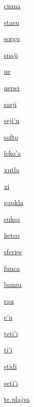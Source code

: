 {\hyperlink{val:cisma}{cisma}}{}{}{}

{\hyperlink{val:stasu}{stasu}}{}{}{}

{\hyperlink{val:sorgu}{sorgu}}{}{}{}

{\hyperlink{val:spaji}{spaji}}{}{}{}

{\hyperlink{val:ue}{ue}}{}{}{}

{\hyperlink{val:uepei}{uepei}}{}{}{}

{\hyperlink{val:sarji}{sarji}}{}{}{}

{\hyperlink{val:sejihu}{seji'u}}{}{}{}

{\hyperlink{val:softo}{softo}}{}{}{}

{\hyperlink{val:lekoha}{leko'a}}{}{}{}

{\hyperlink{val:xutla}{xutla}}{}{}{}

{\hyperlink{val:xi}{xi}}{}{}{}

{\hyperlink{val:gapkla}{gapkla}}{}{}{}

{\hyperlink{val:suksa}{suksa}}{}{}{}

{\hyperlink{val:ketco}{ketco}}{}{}{}

{\hyperlink{val:sferies}{sferies}}{}{}{}

{\hyperlink{val:funca}{funca}}{}{}{}

{\hyperlink{val:banzu}{banzu}}{}{}{}

{\hyperlink{val:rau}{rau}}{}{}{}

{\hyperlink{val:ehu}{e'u}}{}{}{}

{\hyperlink{val:tetihi}{teti'i}}{}{}{}

{\hyperlink{val:tihi}{ti'i}}{}{}{}

{\hyperlink{val:stidi}{stidi}}{}{}{}

{\hyperlink{val:setihi}{seti'i}}{}{}{}

{\hyperlink{val:plajva}{te plajva}}{}{}{}

